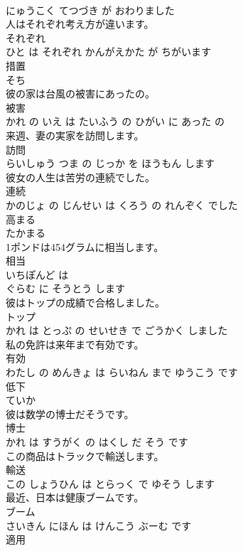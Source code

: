 \documentclass[8pt]{extreport}
\begin{document}
\begin{CJK}{UTF8}{min}
\\	にゅうこく てつづき が おわりました			
\\	人はそれぞれ考え方が違います。	
\\	それぞれ 
\\	ひと は それぞれ かんがえかた が ちがいます			
\\	措置	
\\	そち		
\\	彼の家は台風の被害にあったの。	
\\	被害 
\\	かれ の いえ は たいふう の ひがい に あった の			
\\	来週、妻の実家を訪問します。	
\\	訪問 
\\	らいしゅう つま の じっか を ほうもん します			
\\	彼女の人生は苦労の連続でした。	
\\	連続 
\\	かのじょ の じんせい は くろう の れんぞく でした			
\\	高まる	
\\	たかまる		
\\	1ポンドは454グラムに相当します。	
\\	相当 
\\	いちぽんど は 
\\	ぐらむ に そうとう します			
\\	彼はトップの成績で合格しました。	
\\	トップ 
\\	かれ は とっぷ の せいせき で ごうかく しました			
\\	私の免許は来年まで有効です。	
\\	有効 
\\	わたし の めんきょ は らいねん まで ゆうこう です			
\\	低下	
\\	ていか		
\\	彼は数学の博士だそうです。	
\\	博士 
\\	かれ は すうがく の はくし だ そう です			
\\	この商品はトラックで輸送します。	
\\	輸送 
\\	この しょうひん は とらっく で ゆそう します			
\\	最近、日本は健康ブームです。	
\\	ブーム 
\\	さいきん にほん は けんこう ぶーむ です			
\\	適用	

\end{CJK}
\end{document}
